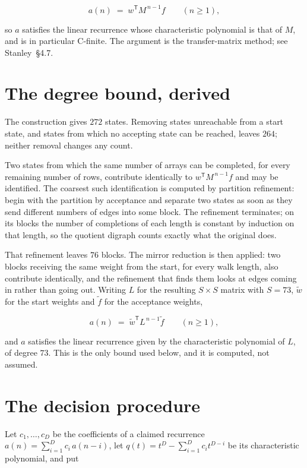 \documentclass[11pt]{article}
\theoremstyle{definition}
\begin{document}
\[a(n) \;=\; w^{\mathsf T} M^{\,n-1} f \qquad (n \ge 1),\]

so $a$ satisfies the linear recurrence whose characteristic polynomial is that of $M$, and is in particular C-finite. The argument is the transfer-matrix method; see Stanley~\S4.7.

\section{The degree bound, derived}

The construction gives $272$ states. Removing states unreachable from a start state, and states from which no accepting state can be reached, leaves $264$; neither removal changes any count.

Two states from which the same number of arrays can be completed, for every remaining number of rows, contribute identically to $w^{\mathsf T}M^{\,n-1}f$ and may be identified. The coarsest such identification is computed by partition refinement: begin with the partition by acceptance and separate two states as soon as they send different numbers of edges into some block. The refinement terminates; on its blocks the number of completions of each length is constant by induction on that length, so the quotient digraph counts exactly what the original does.

That refinement leaves $76$ blocks. The mirror reduction is then applied: two blocks receiving the same weight from the start, for every walk length, also contribute identically, and the refinement that finds them looks at edges coming in rather than going out. Writing $L$ for the resulting $S \times S$ matrix with $S = 73$, $\tilde w$ for the start weights and $\tilde f$ for the acceptance weights,

\[a(n) \;=\; \tilde w^{\mathsf T} L^{\,n-1} \tilde f \qquad (n \ge 1),\]

and $a$ satisfies the linear recurrence given by the characteristic polynomial of $L$, of degree $73$. This is the only bound used below, and it is computed, not assumed.

\section{The decision procedure}

Let $c_1,\dots,c_D$ be the coefficients of a claimed recurrence $a(n) = \sum_{i=1}^{D} c_i\,a(n-i)$, let $q(t) = t^{D} - \sum_{i=1}^{D} c_i t^{D-i}$ be its characteristic polynomial, and put
\end{document}
